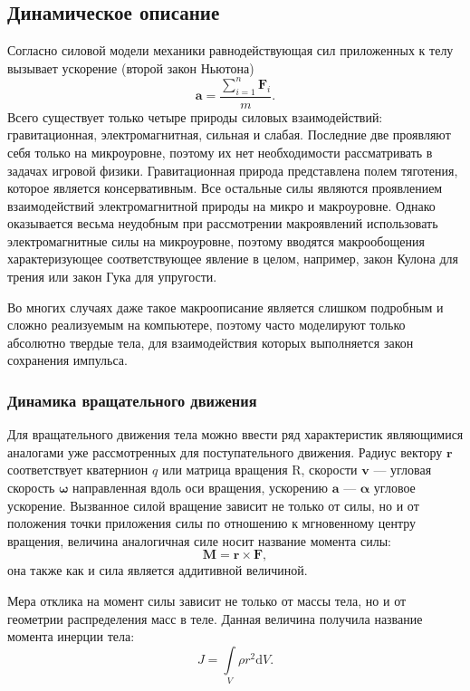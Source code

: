 \subsection{Динамическое описание}
Согласно силовой модели механики равнодействующая сил приложенных к телу вызывает ускорение (второй закон Ньютона)
\begin{equation}
 \mathbf{a}=\frac{\sum\limits_{i=1}^n{\mathbf{F}_i}}{m}.
\end{equation}
Всего существует только четыре природы силовых взаимодействий: гравитационная, электромагнитная, сильная и слабая.
Последние две проявляют себя только на микроуровне, поэтому их нет необходимости рассматривать в задачах
игровой физики. Гравитационная природа представлена полем тяготения, которое является консервативным. 
Все остальные силы являются проявлением взаимодействий электромагнитной природы на микро и макроуровне.
Однако оказывается весьма неудобным при рассмотрении макроявлений использовать электромагнитные силы на микроуровне,
поэтому вводятся макрообощения характеризующее соответствующее явление в целом, например, закон Кулона
для трения или закон Гука для упругости.

Во многих случаях даже такое макроописание является слишком подробным и сложно реализуемым на компьютере,
поэтому часто моделируют только абсолютно твердые тела, для взаимодействия которых выполняется закон 
сохранения импульса.
\subsubsection{Динамика вращательного движения}
Для вращательного движения тела можно ввести ряд характеристик
являющимися аналогами уже рассмотренных для поступательного движения.
Радиус вектору $ \mathbf{r} $ соответствует кватернион $q$ или матрица вращения $\mathrm{R}$,
скорости $\mathbf{v}$ --- угловая скорость $\boldsymbol{\omega}$ направленная вдоль оси вращения,
ускорению $\mathbf{a}$ --- $\boldsymbol{\alpha}$ угловое ускорение.
Вызванное силой вращение зависит не только от силы, но и от положения точки приложения силы
по отношению к мгновенному центру вращения, величина аналогичная силе носит название момента силы:
\begin{equation}
 \mathbf{M} = \mathbf{r}\times{\mathbf{F}}, 
\end{equation}
она также как и сила является аддитивной величиной.

Мера отклика на момент силы зависит не только от массы тела, но и от геометрии распределения
масс в теле. Данная величина получила название момента инерции тела:
\begin{equation}
 J=\int\limits_{V} \rho r^2\mathrm{d}V.
\end{equation}

